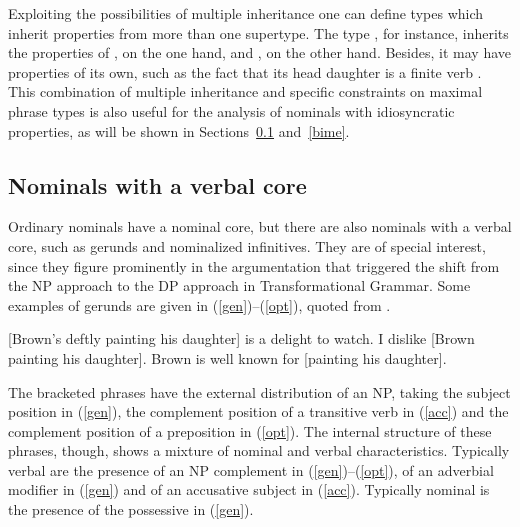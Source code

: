 \documentclass[output=paper
                ,modfonts
                ,nonflat
	        ,collection
	        ,collectionchapter
	        ,collectiontoclongg
 	        ,biblatex
                ,babelshorthands
                ,newtxmath
                ,draftmode
                ,colorlinks, citecolor=brown
]{./langsci/langscibook}
\begin{document}
Exploiting the possibilities of multiple inheritance one can 
define types which inherit properties from more than one supertype. 
The type , for instance, inherits 
the properties of , on the one hand, and 
, on the other hand. Besides, it may 
have properties of its own, such as the fact that its head daughter 
is a finite verb \citep[43]{GS00}. 
This combination of multiple inheritance and specific   
constraints on maximal phrase types is also useful for the analysis of 
nominals with idiosyncratic properties, as will be shown in Sections~\ref{geru} 
and~\ref{bime}. 


\subsection{Nominals with a verbal core} 
\label{geru}


Ordinary nominals have a nominal core, but there are also nominals  
with a verbal core, such as gerunds and nominalized infinitives. They are 
of special interest, since they figure prominently in the argumentation 
that triggered the shift from the NP approach to the DP approach in Transformational 
Grammar. Some examples of gerunds are given in (\ref{gen})--(\ref{opt}), 
quoted from \citet[1290]{Quirketal85}. 

\begin{exe} 
\ex\label{gen}  {}[Brown's deftly painting his daughter] is a delight to watch. 
\ex\label{acc}  I dislike [Brown painting his daughter]. 
\ex\label{opt}  Brown is well known for [painting his daughter].
\end{exe}

\noindent
The bracketed phrases have the external distribution of an NP, 
taking the subject position in (\ref{gen}), 
the complement position of a transitive verb in (\ref{acc}) and 
the complement position of a preposition in (\ref{opt}). 
The internal structure of these phrases, though, shows a mixture of nominal and verbal 
characteristics. 
Typically verbal are the presence of an NP complement in (\ref{gen})--(\ref{opt}), 
of an adverbial modifier in (\ref{gen}) and of an accusative subject in (\ref{acc}). 
Typically nominal is the presence of the possessive in (\ref{gen}). 
\end{document}

